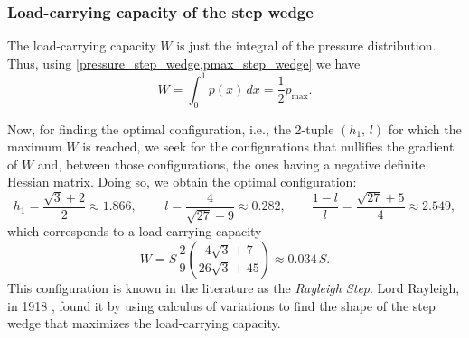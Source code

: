 \subsubsection*{Load-carrying capacity of the step wedge} The load-carrying capacity $W$ is just the integral of the pressure distribution. Thus, using \eqref*{pressure_step_wedge,pmax_step_wedge} we have
\begin{equation}W=\int_0^1 p(x)\,dx=\frac{1}{2}p_\text{max}.\label{eq:load_step_wedge}
\end{equation}

Now, for finding the optimal configuration, i.e., the 2-tuple $(h_1,\,l)$ for which the maximum $W$ is reached, we seek for the configurations that nullifies the gradient of $W$ and, between those configurations, the ones having a negative definite Hessian matrix. Doing so, we obtain the optimal configuration:
\begin{equation*}
h_1=\frac{\sqrt{3}+2}{2}\approx 1.866,\,\qquad l=\frac{4}{\sqrt{27}+9}\approx 0.282,\qquad\frac{1-l}{l}=\frac{\sqrt{27}+5}{4}\approx 2.549,
\end{equation*}
which corresponds to a load-carrying capacity$$W=S\,\frac{2}{9}\left(\frac{4\sqrt{3}+7}{26\sqrt{3}+45}\right)\approx 0.034\,S.$$
This configuration is known in the literature as the \emph{Rayleigh Step}. Lord Rayleigh, in 1918 \cite{rayleigh1918}, found it by using calculus of variations to find the shape of the step wedge  that maximizes the load-carrying capacity.
